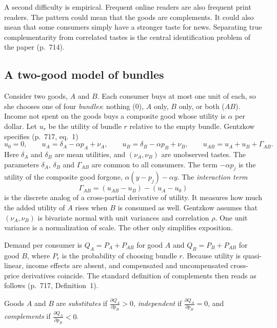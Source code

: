 A second difficulty is empirical. Frequent online readers are also frequent print readers. The pattern could mean that
the goods are complements. It could also mean that some consumers simply have a stronger taste for news. Separating
true complementarity from correlated tastes is the central identification problem of the paper (p.~714).

\subsection{A two-good model of bundles}\label{sec:10-gentzkow-model}

Consider two goods, $A$ and $B$. Each consumer buys at most one unit of each, so she chooses one of four
\emph{bundles}: nothing ($0$), $A$ only, $B$ only, or both ($AB$). Income not spent on the goods buys a composite good
whose utility is $\alpha$ per dollar. Let $u_r$ be the utility of bundle $r$ relative to the empty bundle. Gentzkow
specifies (p.~717, eq.~1)
\begin{equation}\label{eq:10-gentzkow-twogood}
  u_0 = 0, \qquad u_A = \delta_A - \alpha p_A + \nu_A, \qquad u_B = \delta_B - \alpha p_B + \nu_B, \qquad
  u_{AB} = u_A + u_B + \Gamma_{AB} .
\end{equation}
Here $\delta_A$ and $\delta_B$ are mean utilities, and $(\nu_A, \nu_B)$ are unobserved tastes. The parameters
$\delta_A$, $\delta_B$ and $\Gamma_{AB}$ are common to all consumers. The term $-\alpha p_j$ is the utility of the
composite good forgone, $\alpha(y - p_j) - \alpha y$. The \emph{interaction term}
\begin{equation*}
  \Gamma_{AB} = (u_{AB} - u_B) - (u_A - u_0)
\end{equation*}
is the discrete analog of a cross-partial derivative of utility. It measures how much the added utility of $A$ rises
when $B$ is consumed as well. Gentzkow assumes that $(\nu_A, \nu_B)$ is bivariate normal with unit variances and
correlation $\rho$. One unit variance is a normalization of scale. The other only simplifies exposition.

Demand per consumer is $Q_A = P_A + P_{AB}$ for good $A$ and $Q_B = P_B + P_{AB}$ for good $B$, where $P_r$ is the
probability of choosing bundle $r$. Because utility is quasi-linear, income effects are absent, and compensated and
uncompensated cross-price derivatives coincide. The standard definition of complements \citep{Samuelson1974} then reads
as follows (p.~717, Definition~1).

\begin{definition}\label{def:10-gentzkow-complements}
Goods $A$ and $B$ are \emph{substitutes} if $\frac{\partial Q_A}{\partial p_B} > 0$, \emph{independent} if
$\frac{\partial Q_A}{\partial p_B} = 0$, and \emph{complements} if $\frac{\partial Q_A}{\partial p_B} < 0$.
\end{definition}

